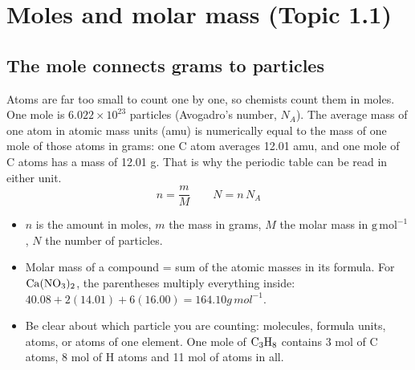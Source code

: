 \documentclass[11pt]{article}
\begin{document}
\titleblock
\begin{abstract}
This guide covers all of Unit 1, Atomic Structure and Properties, in nine sections: one for each of Topics 1.1--1.8 in course order, plus a final section on lab skills and free-response technique. Each section gives the definitions, equations and particle-level reasoning the topic needs, at least one worked example, the phrasing that earns free-response points and the mistakes that cost them. The worked examples use their own numbers, so none of them give away an item in \emph{Unit 1 Practice Set A} or \emph{Unit 1 Practice Set B}; the answer keys of both sets point back to the section numbers here. Plan on about 60 minutes for a full read with a calculator out. Read a section, cover its worked examples and redo them on paper, and only then move on.
\end{abstract}

\section{Moles and molar mass (Topic 1.1)}\label{t:1.1}
\subsection{The mole connects grams to particles}
Atoms are far too small to count one by one, so chemists count them in moles. One mole is $6.022\times10^{23}$ particles (Avogadro's number, $N_A$). The average mass of one atom in atomic mass units (amu) is numerically equal to the mass of one mole of those atoms in grams: one C atom averages 12.01 amu, and one mole of C atoms has a mass of 12.01 g. That is why the periodic table can be read in either unit.
\[ n = \frac{m}{M} \qquad N = n\,N_A \]
\begin{itemize}
\item $n$ is the amount in moles, $m$ the mass in grams, $M$ the molar mass in $\mathrm{g\,mol^{-1}}$, $N$ the number of particles.
\item Molar mass of a compound = sum of the atomic masses in its formula. For $\ce{Ca(NO3)2}$, the parentheses multiply everything inside: $40.08 + 2(14.01) + 6(16.00) = 164.10\unit{g\,mol^{-1}}$.
\item Be clear about which particle you are counting: molecules, formula units, atoms, or atoms of one element. One mole of $\ce{C3H8}$ contains 3 mol of C atoms, 8 mol of H atoms and 11 mol of atoms in all.
\end{itemize}
\end{document}
